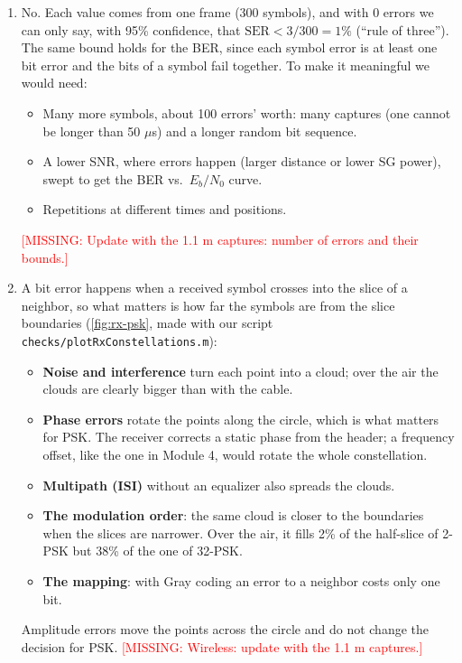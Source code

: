 \documentclass[11pt]{article}
\newcommand{\missing}[1]{\textcolor{red}{[MISSING: #1]}}
\begin{document}
\begin{enumerate}[resume]
    \item No. Each value comes from one frame (300 symbols), and with 0 errors we can only say, with 95\% confidence, that $\text{SER} < 3/300 = 1\%$ (``rule of three''). The same bound holds for the BER, since each symbol error is at least one bit error and the bits of a symbol fail together. To make it meaningful we would need:
    \begin{itemize}
        \item Many more symbols, about 100 errors' worth: many captures (one cannot be longer than 50 $\mu$s) and a longer random bit sequence.
        \item A lower SNR, where errors happen (larger distance or lower SG power), swept to get the BER vs.\ $E_b/N_0$ curve.
        \item Repetitions at different times and positions.
    \end{itemize}
    \missing{Update with the 1.1 m captures: number of errors and their bounds.}

    \item A bit error happens when a received symbol crosses into the slice of a neighbor, so what matters is how far the symbols are from the slice boundaries (\cref{fig:rx-psk}, made with our script \texttt{checks/plotRxConstellations.m}):
    \begin{itemize}
        \item \textbf{Noise and interference} turn each point into a cloud; over the air the clouds are clearly bigger than with the cable.
        \item \textbf{Phase errors} rotate the points along the circle, which is what matters for PSK. The receiver corrects a static phase from the header; a frequency offset, like the one in Module 4, would rotate the whole constellation.
        \item \textbf{Multipath (ISI)} without an equalizer also spreads the clouds.
        \item \textbf{The modulation order}: the same cloud is closer to the boundaries when the slices are narrower. Over the air, it fills 2\% of the half-slice of 2-PSK but 38\% of the one of 32-PSK.
        \item \textbf{The mapping}: with Gray coding an error to a neighbor costs only one bit.
    \end{itemize}
    Amplitude errors move the points across the circle and do not change the decision for PSK. \missing{Wireless: update with the 1.1 m captures.}


\end{enumerate}
\end{document}
